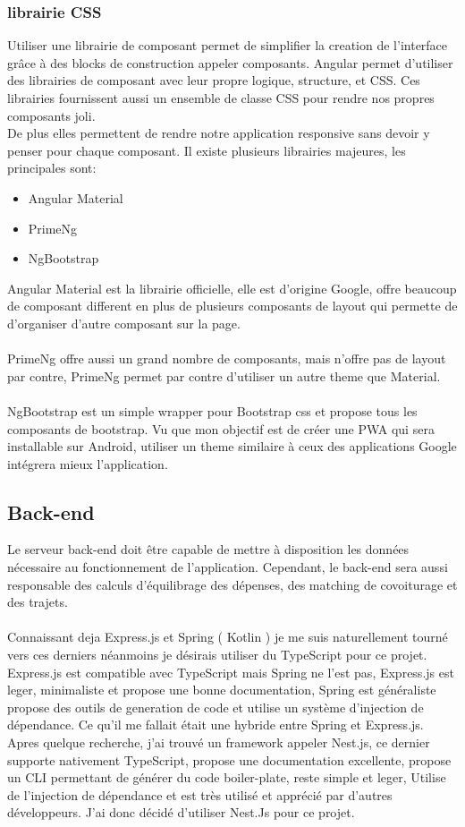 \subsubsection{librairie CSS}
Utiliser une librairie de composant permet de simplifier la creation de l'interface grâce à des blocks de construction appeler composants\@.
Angular permet d'utiliser des librairies de composant avec leur propre logique, structure, et CSS\@.
Ces librairies fournissent aussi un ensemble de classe CSS pour rendre nos propres composants joli.\\
De plus elles permettent de rendre notre application responsive sans devoir y penser pour chaque composant.
Il existe plusieurs librairies majeures, les principales sont:
\begin{itemize}
    \item Angular Material
    \item PrimeNg
    \item NgBootstrap
\end{itemize}
Angular Material est la librairie officielle, elle est d'origine Google,
offre beaucoup de composant different en plus de plusieurs composants de layout qui permette de d'organiser d'autre composant sur la page.\\\\
PrimeNg offre aussi un grand nombre de composants, mais n'offre pas de layout par contre,
PrimeNg permet par contre d'utiliser un autre theme que Material.\\\\
NgBootstrap est un simple wrapper pour Bootstrap css et propose tous les composants de bootstrap.
Vu que mon objectif est de créer une PWA qui sera installable sur Android,
utiliser un theme similaire à ceux des applications Google intégrera mieux l'application.

\subsection{Back-end}\label{subsec:back-end}
Le serveur back-end doit être capable de mettre à disposition les données nécessaire au fonctionnement de l'application.
Cependant, le back-end sera aussi responsable des calculs d'équilibrage des dépenses, des matching de covoiturage et des trajets.\\\\
Connaissant deja Express.js et Spring ( Kotlin ) je me suis naturellement tourné vers ces derniers néanmoins je désirais utiliser du TypeScript pour ce projet.
Express.js est compatible avec TypeScript mais Spring ne l'est pas, Express.js est leger, minimaliste et propose une bonne documentation,
Spring est généraliste propose des outils de generation de code et utilise un système d'injection de dépendance.
Ce qu'il me fallait était une hybride entre Spring et Express.js.
Apres quelque recherche, j'ai trouvé un framework appeler Nest.js, ce dernier supporte nativement TypeScript, propose une documentation excellente,
propose un CLI permettant de générer du code boiler-plate, reste simple et leger, Utilise de l'injection de dépendance et est très utilisé et apprécié par d'autres développeurs.
J'ai donc décidé d'utiliser Nest.Js pour ce projet.

